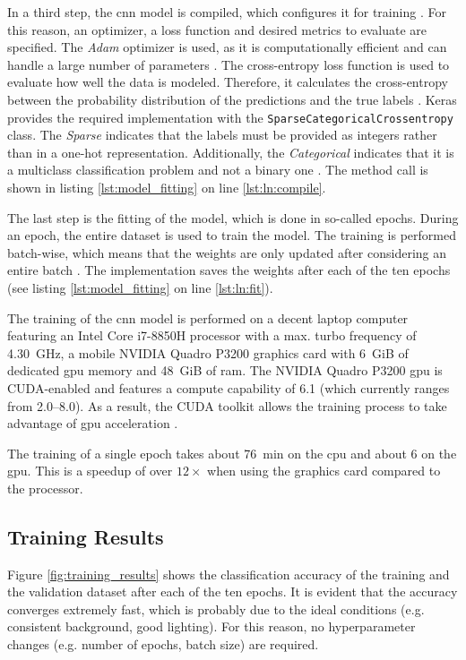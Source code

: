 In a third step, the \acrshort{cnn} model is compiled, which configures it for training \cite{training_arch_tf_keras_sequential}.
For this reason, an optimizer, a loss function and desired metrics to evaluate are specified.
The \textit{Adam} optimizer is used, as it is computationally efficient and can handle a large number of parameters \cite{training_arch_adam}.
The cross-entropy loss function is used to evaluate how well the data is modeled.
Therefore, it calculates the cross-entropy between the probability distribution of the predictions and the true labels \cite{training_train_entropy}.
Keras provides the required implementation with the \texttt{SparseCategoricalCrossentropy} class.
The \textit{Sparse} indicates that the labels must be provided as integers rather than in a one-hot representation.
Additionally, the \textit{Categorical} indicates that it is a multiclass classification problem and not a binary one \cite{training_train_tf_keras_crossentropy}.
The method call is shown in listing \ref{lst:model_fitting} on line \ref{lst:ln:compile}.

The last step is the fitting of the model, which is done in so-called epochs.
During an epoch, the entire dataset is used to train the model.
The training is performed batch-wise, which means that the weights are only updated after considering an entire batch \cite{training_arch_tf_keras_sequential}.
The implementation saves the weights after each of the ten epochs (see listing \ref{lst:model_fitting} on line \ref{lst:ln:fit}).

The training of the \acrshort{cnn} model is performed on a decent laptop computer featuring an Intel Core i7-8850H processor with a max. turbo frequency of \SI{4.30}{GHz}, a mobile NVIDIA Quadro P3200 graphics card with \SI{6}{GiB} of dedicated \acrshort{gpu} memory and \SI{48}{GiB} of \acrshort{ram}.
The NVIDIA Quadro P3200 \acrshort{gpu} is CUDA-enabled and features a compute capability of \num{6.1} (which currently ranges from \numrange{2.0}{8.0}).
As a result, the CUDA toolkit allows the training process to take advantage of \acrshort{gpu} acceleration \cite{training_train_nvidia}.

The training of a single epoch takes about \SI{76}{min} on the \acrshort{cpu} and about \SI{6}{\min} on the \acrshort{gpu}.
This is a speedup of over $12\times$ when using the graphics card compared to the processor.

\subsection{Training Results}
\label{subsec:training_of_the_cnn:training:training_results}
Figure \ref{fig:training_results} shows the classification accuracy of the training and the validation dataset after each of the ten epochs.
It is evident that the accuracy converges extremely fast, which is probably due to the ideal conditions (e.g. consistent background, good lighting).
For this reason, no hyperparameter changes (e.g. number of epochs, batch size) are required.

